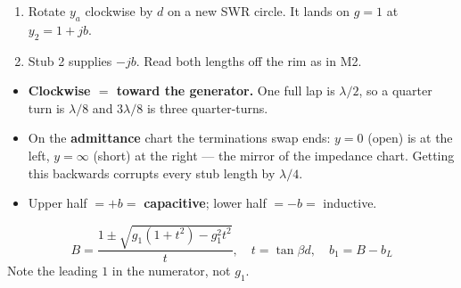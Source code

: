 {\begin{enumerate}[label=\arabic*., leftmargin=1.4em]
    $y_a$, $y_a'$. Then $b_1 = \operatorname{Im}(y_a) - \operatorname{Im}(y_1)$.
  \item Rotate $y_a$ clockwise by $d$ on a new SWR circle. It lands on $g=1$ at
    $y_2 = 1 + jb$.
  \item Stub 2 supplies $-jb$. Read both lengths off the rim as in M2.
\end{enumerate}
\begin{itemize}
  \item \textbf{Clockwise $=$ toward the generator.} One full lap is $\lambda/2$, so a
    quarter turn is $\lambda/8$ and $3\lambda/8$ is three quarter-turns.
  \item On the \textbf{admittance} chart the terminations swap ends: $y=0$ (open) is at
    the left, $y=\infty$ (short) at the right --- the mirror of the impedance chart.
    Getting this backwards corrupts every stub length by $\lambda/4$.
  \item Upper half $= +b =$ \textbf{capacitive}; lower half $= -b =$ inductive.
\end{itemize}
\[ B = \frac{1 \pm \sqrt{g_1(1+t^2) - g_1^2 t^2}}{t}, \quad t = \tan\beta d,
   \quad b_1 = B - b_L \]
{\footnotesize\color{sub} Note the leading $1$ in the numerator, not $g_1$.}}

\vspace{2pt}


